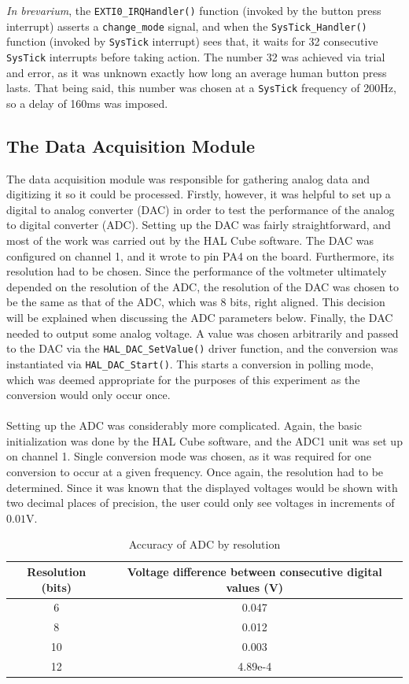 \documentclass[12pt]{report}
\begin{document}
\textit{In brevarium}, the \texttt{EXTI0\_IRQHandler()} function (invoked by the button press
interrupt) asserts a \texttt{change\_mode} signal, and when the \texttt{SysTick\_Handler()} function
(invoked by \texttt{SysTick} interrupt) sees that, it waits for 32 consecutive \texttt{SysTick}
interrupts before taking action. The number 32 was achieved via trial and error, as it was unknown
exactly how long an average human button press lasts. That being said, this number was chosen at a
\texttt{SysTick} frequency of 200Hz, so a delay of 160ms was imposed.

\subsection{The Data Acquisition Module}\label{dataaq}
The data acquisition module was responsible for gathering analog data and digitizing it so it could
be processed. Firstly, however, it was helpful to set up a digital to analog converter (DAC) in
order to test the performance of the analog to digital converter (ADC). Setting up the DAC was
fairly straightforward, and most of the work was carried out by the HAL Cube software. The DAC was
configured on channel 1, and it wrote to pin PA4 on the board. Furthermore, its resolution had to be
chosen. Since the performance of the voltmeter ultimately depended on the resolution of the ADC, the
resolution of the DAC was chosen to be the same as that of the ADC, which was 8 bits, right aligned.
This decision will be explained when discussing the ADC parameters below. Finally, the DAC needed to
output some analog voltage. A value was chosen arbitrarily and passed to the DAC via the
\texttt{HAL\_DAC\_SetValue()} driver function, and the conversion was instantiated via
\texttt{HAL\_DAC\_Start()}. This starts a conversion in polling mode, which was deemed appropriate
for the purposes of this experiment as the conversion would only occur once.\\\\
Setting up the ADC was considerably more complicated. Again, the basic initialization was done by
the HAL Cube software, and the ADC1 unit was set up on channel 1. Single conversion mode was chosen,
as it was required for one conversion to occur at a given frequency. Once again, the resolution had
to be determined. Since it was known that the displayed voltages would be shown with two decimal
places of precision, the user could only see voltages in increments of $0.01$V. 
\begin{table}[h]\label{adcres}
	\caption{Accuracy of ADC by resolution}
	\begin{center}
		\begin{tabular}{|c|c|}
			\hline
			Resolution (bits) & Voltage difference between consecutive digital values (V)\\\hline
			6 & 0.047\\\hline
			8 & 0.012\\\hline
			10 & 0.003\\\hline
			12 & 4.89e-4\\\hline
		\end{tabular}
	\end{center}
\end{table}
\end{document}
